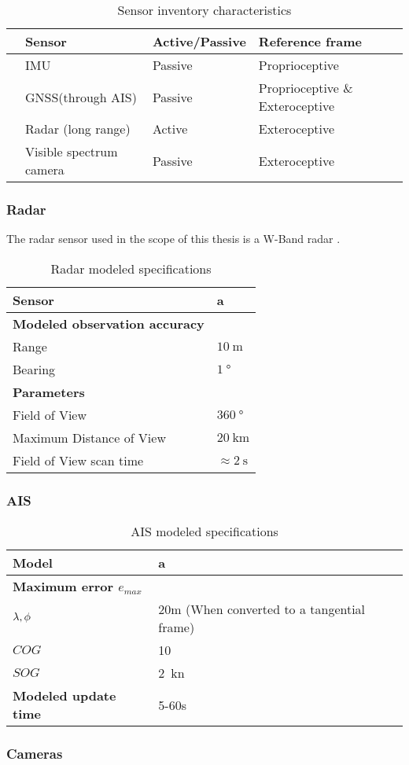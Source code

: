 \begin{table}[H]
		\centering
	\caption{Sensor inventory characteristics}
	\label{tab:sensor_active}
	\begin{tabular}{llll}
		\hline
		& \textbf{Sensor}         & \textbf{Active/Passive} & \textbf{Reference frame} \\ \hline
		& IMU                     & Passive                 & Proprioceptive                        \\ 
		& GNSS(through AIS)       & Passive                 & Proprioceptive \& Exteroceptive \\
		& Radar (long range)      & Active                  & Exteroceptive                         \\ 
		& Visible spectrum camera & Passive                 & Exteroceptive                         \\ \hline
	\end{tabular}
\end{table}

\subsubsection{Radar}
The radar sensor used in the scope of this thesis is a W-Band radar . 


\begin{table}[]
	\centering
	\caption{Radar modeled specifications}
	\label{tab:radar_specs}
	\begin{tabular}{ll}
		\hline
		\textbf{Sensor} & a \\ \hline
		\textbf{Modeled observation accuracy} &  \\
		Range & $\SI{10}{\m}$ \\
		Bearing & $\SI{1}{\degree}$ \\ \hline
		\textbf{Parameters} &  \\
		Field of View & $\SI{360}{\degree}$ \\
		Maximum Distance of View & $\SI{20}{\km}$ \\
		Field of View scan time & $\approx \SI{2}{\second}$ \\ \hline
	\end{tabular}
\end{table}
\subsubsection{AIS}

\begin{table}[H]
	\centering
	\caption{AIS modeled specifications}
	\label{tab:AIS_specs}
	\begin{tabular}{ll}
		\hline
		\textbf{Model} & a \\ \hline
		\textbf{Maximum error $e_{max}$} &  \\
		${{\lambda} ,{\phi}}$ & 20m (When converted to a tangential frame) \\
		${COG}$ & \SI{10}{\deg} \\
		${SOG}$ & \SI{2}{\knot} \\ \hline
		\textbf{Modeled update time} & 5-60s \\ \hline
	\end{tabular}
\end{table}

\subsubsection{Cameras}

